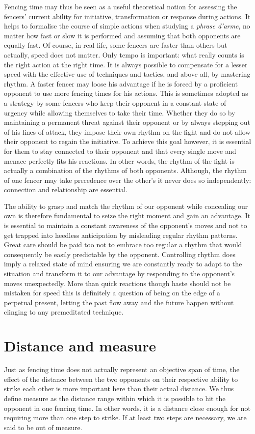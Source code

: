 Fencing time may thus be seen as a useful theoretical notion for assessing the fencers' current ability for initiative, transformation or response during actions. 
It helps to formalise the course of simple actions when studying a \emph{phrase d'arme}, no matter how fast or slow it is performed and assuming that both opponents are equally fast.
Of course, in real life, some fencers are faster than others but actually, speed does not matter. Only tempo is important: what really counts is the right action at the right time.
It is always possible to compensate for a lesser speed with the effective use of techniques and tactics, and above all, by mastering rhythm.
A faster fencer may loose his advantage if he is forced by a proficient opponent to use more fencing times for his actions.
This is sometimes adopted as a strategy by some fencers who keep their opponent in a constant state of urgency while allowing themselves to take their time.
Whether they do so by maintaining a permanent threat against their opponent or by always stepping out of his lines of attack, they impose their own rhythm on the fight and do not allow their opponent to regain the initiative.
To achieve this goal however, it is essential for them to stay connected to their opponent and that every single move and menace perfectly fits his reactions.
In other words, the rhythm of the fight is actually a combination of the rhythms of both opponents.
Although, the rhythm of one fencer may take precedence over the other's it never does so independently: connection and relationship are essential.

The ability to grasp and match the rhythm of our opponent while concealing our own is therefore fundamental to seize the right moment and gain an advantage.
It is essential to maintain a constant awareness of the opponent's moves and not to get trapped into heedless anticipation by misleading regular rhythm patterns. 
Great care should be paid too not to embrace too regular a rhythm that would consequently be easily predictable by the opponent. 
Controlling rhythm does imply a relaxed state of mind ensuring we are constantly ready to adapt to the situation and transform it to our advantage by responding to the opponent's moves unexpectedly.
More than quick reactions though \textemdash{} haste should not be mistaken for speed \textemdash{} this is definitely a question of being on the edge of a perpetual present, letting the past flow away and the future happen without clinging to any premeditated technique.

\section{Distance and measure} 
Just as fencing time does not actually represent an objective span of time, the effect of the distance between the two opponents on their respective ability to strike each other is more important here than their actual distance.
We thus define measure  as the distance range within which it is possible to hit the opponent in one fencing time.
In other words, it is a distance close enough for not requiring more than one step to strike.
If at least two steps are necessary, we are said to be out of measure.

